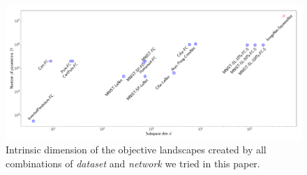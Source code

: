 \documentclass{article} %
\begin{document}
\begin{figure}[h!] \centering
	\hspace{-3mm}
	\includegraphics[width=14.0cm]{d_int_road_map}
	\caption{Intrinsic dimension of the objective landscapes created by all combinations of \emph{dataset} and \emph{network} we tried in this paper.}
	\label{fig:summarized_d}
	\vspace{-2mm}
\end{figure}
%
\end{document}
